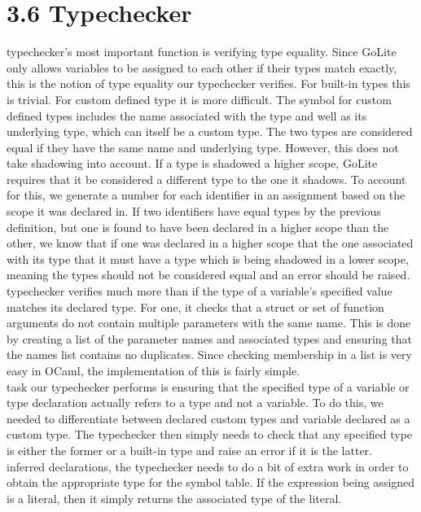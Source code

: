\documentclass{article}
\begin{document}
\section*{3.6 Typechecker}\mbox{}
 typechecker's most important function is verifying type equality.
Since GoLite only allows variables to be assigned to each other if their types match exactly, this is the notion of type equality our typechecker verifies.
For built-in types this is trivial.
For custom defined type it is more difficult.
The symbol for custom defined types includes the name associated with the type and well as its underlying type, which can itself be a custom type.
The two types are considered equal if they have the same name and underlying type.
However, this does not take shadowing into account.
If a type is shadowed a higher scope, GoLite requires that it be considered a different type to the one it shadows.
To account for this, we generate a number for each identifier in an assignment based on the scope it was declared in.
If two identifiers have equal types by the previous definition, but one is found to have been declared in a higher scope than the other, we know that if one was declared in a higher scope that the one associated with its type that it must have a type which is being shadowed in a lower scope, meaning the types should not be considered equal and an error should be raised.\\
 typechecker verifies much more than if the type of a variable's specified value matches its declared type.
For one, it checks that a struct or set of function arguments do not contain multiple parameters with the same name.
This is done by creating a list of the parameter names and associated types and ensuring that the names list contains no duplicates.
Since checking membership in a list is very easy in OCaml, the implementation of this is fairly simple.\\
 task our typechecker performs is ensuring that the specified type of a variable or type declaration actually refers to a type and not a variable.
To do this, we needed to differentiate between declared custom types and variable declared as a custom type.
The typechecker then simply needs to check that any specified type is either the former or a built-in type and raise an error if it is the latter.\\
 inferred declarations, the typechecker needs to do a bit of extra work in order to obtain the appropriate type for the symbol table.
If the expression being assigned is a literal, then it simply returns the associated type of the literal.
\end{document}
